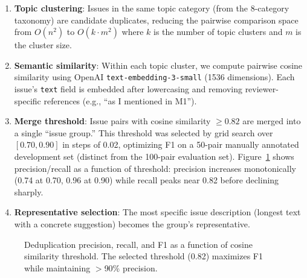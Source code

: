 \begin{enumerate}
    \item \textbf{Topic clustering}: Issues in the same topic category (from the 8-category taxonomy) are candidate duplicates, reducing the pairwise comparison space from $O(n^2)$ to $O(k \cdot m^2)$ where $k$ is the number of topic clusters and $m$ is the cluster size.
    \item \textbf{Semantic similarity}: Within each topic cluster, we compute pairwise cosine similarity using OpenAI \texttt{text-embedding-3-small} (1536 dimensions). Each issue's \texttt{text} field is embedded after lowercasing and removing reviewer-specific references (e.g., ``as I mentioned in M1'').
    \item \textbf{Merge threshold}: Issue pairs with cosine similarity $\geq 0.82$ are merged into a single ``issue group.'' This threshold was selected by grid search over $[0.70, 0.90]$ in steps of 0.02, optimizing F1 on a 50-pair manually annotated development set (distinct from the 100-pair evaluation set). Figure~\ref{fig:threshold} shows precision/recall as a function of threshold: precision increases monotonically (0.74 at 0.70, 0.96 at 0.90) while recall peaks near 0.82 before declining sharply.
    \item \textbf{Representative selection}: The most specific issue description (longest text with a concrete suggestion) becomes the group's representative.
\end{enumerate}

\begin{figure}[h]
\centering
{}
\caption{Deduplication precision, recall, and F1 as a function of cosine similarity threshold. The selected threshold (0.82) maximizes F1 while maintaining $>$90\% precision.}
\label{fig:threshold}
\end{figure}

